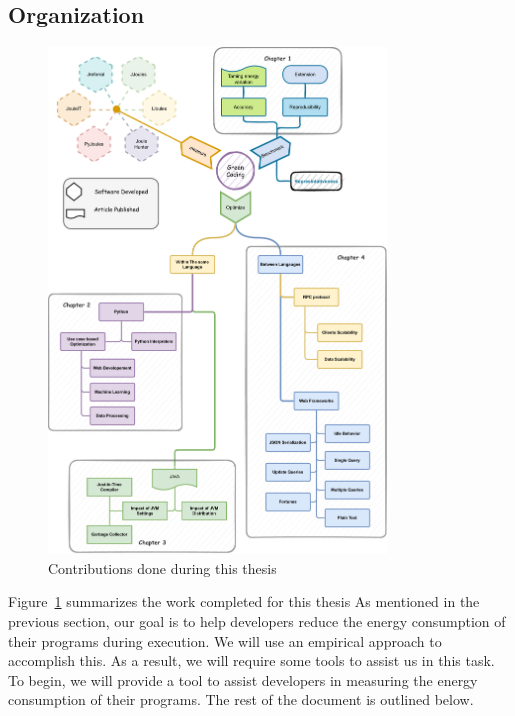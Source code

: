 \subsection*{Organization}
\begin{figure}[!h]
    \centering
    \includegraphics[width=0.8\textwidth,height=\textheight,keepaspectratio]{chapters/thesis_contributions.pdf}
    \caption{Contributions done during this thesis }
    \label{fig:thesis_contributions}
\end{figure}

Figure~\ref{fig:thesis_contributions} summarizes the work completed for this thesis As mentioned in the previous section, our goal is to help developers reduce the energy consumption of their programs during execution.
We will use an empirical approach to accomplish this. As a result, we will require some tools to assist us in this task. To begin, we will provide a tool to assist developers in measuring the energy consumption of their programs. The rest of the document is outlined below.

